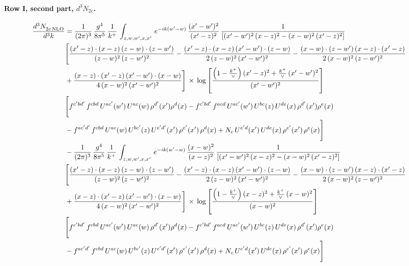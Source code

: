 \documentclass[10pt]{article}
\numberwithin{equation}{section}
\begin{document}
\paragraph{Row I, second part, $d^3N_{2c}$.}
\begin{align}
    \frac{d^{3}N_{2c\,\rm NLO}^{\rm}}{d^{3}k}  & =  \frac{1}{(2\pi)^{3}}\, \frac{g^{4}}{8\pi^{5}}\,\frac{1}{k^{+}}\,\int_{z,w,w^{\prime},x,x'}\, e^{-ik(w^{\prime}-w)}\,\frac{(x'-w')^{2}}{(x'-z)^{2}}\, \frac{1}{\left[(x'-w')^{2}\, (x-z)^{2} - (x-w)^{2}\, (x'-z)^{2}\right]} \notag \\ & \Bigg[\frac{(x'-z)\cdot (x-z)\, (z-w)\cdot (z-w')}{(z-w)^{2}\, (z-w')^{2}}-\frac{(x'-z)\cdot (x-z)\, (x'-w')\cdot (z-w)}{2\, (z-w)^{2}\, (x'-w')^{2}} -\frac{(x-w)\cdot (z-w')\, (x-z)\cdot (x'-z)}{2\, (x-w)^{2}\, (z-w')^{2}}\notag \\ & +\frac{(x-z)\cdot (x'-z)\, (x'-w')\cdot (x-w)}{4\, (x-w)^{2}\, (x'-w')^{2}}\Bigg]\,\times\, \log{\left[\frac{\left(1-\frac{k^{+}}{\vee}\right)(x'-z)^{2}+\frac{k^{+}}{\vee}\,(x'-w')^{2}}{(x'-w')^{2}}\right]} \notag \\ &  \Bigg[f^{c'bd'}\,f^{cbd}\, U^{ac'}(w')\,U^{ac}(w)\,\rho^{d'}(x')\rho^{d}(x)- f^{c'bd'}\,f^{acd}\,U^{ac'}(w')\,U^{bc}(z)\,U^{de}(x)\,\rho^{d'}(x')\rho^{e}(x) \notag \\ & -f^{ac'd'}\,f^{cbd}\,U^{ac}(w)\,U^{bc'}(z)\,U^{e'd'}(x')\,\rho^{e'}(x')\,\rho^{d}(x) +N_{c}\,U^{e'd}(x')\,U^{de}(x)\,\rho^{e'}(x')\,\rho^{e}(x)\Bigg] \notag \\
& -\frac{1}{(2\pi)^{3}}\, \frac{g^{4}}{8\pi^{5}}\,\frac{1}{k^{+}}\,\int_{z,w,w^{\prime},x,x'}\, e^{-ik(w^{\prime}-w)}\,\frac{(x-w)^{2}}{(x-z)^{2}}\, \frac{1}{\left[(x'-w')^{2}\, (x-z)^{2} - (x-w)^{2}\, (x'-z)^{2}\right]} \notag \\ & \Bigg[\frac{(x'-z)\cdot (x-z)\, (z-w)\cdot (z-w')}{(z-w)^{2}\, (z-w')^{2}}-\frac{(x'-z)\cdot (x-z)\, (x'-w')\cdot (z-w)}{2\, (z-w)^{2}\, (x'-w')^{2}} -\frac{(x-w)\cdot (z-w')\, (x-z)\cdot (x'-z)}{2\, (x-w)^{2}\, (z-w')^{2}}\notag \\ & +\frac{(x-z)\cdot (x'-z)\, (x'-w')\cdot (x-w)}{4\, (x-w)^{2}\, (x'-w')^{2}}\Bigg]\,\times\, \log{\left[\frac{\left(1-\frac{k^{+}}{\vee}\right)(x-z)^{2}+\frac{k^{+}}{\vee}\,(x-w)^{2}}{(x-w)^{2}}\right]} \notag \\ &  \Bigg[f^{c'bd'}\,f^{cbd}\, U^{ac'}(w')\,U^{ac}(w)\,\rho^{d'}(x')\rho^{d}(x)- f^{c'bd'}\,f^{acd}\,U^{ac'}(w')\,U^{bc}(z)\,U^{de}(x)\,\rho^{d'}(x')\rho^{e}(x) \notag \\ & -f^{ac'd'}\,f^{cbd}\,U^{ac}(w)\,U^{bc'}(z)\,U^{e'd'}(x')\,\rho^{e'}(x')\,\rho^{d}(x) +N_{c}\,U^{e'd}(x')\,U^{de}(x)\,\rho^{e'}(x')\,\rho^{e}(x)\Bigg] \label{eq:F:G2I2c}
\end{align}
\end{document}
